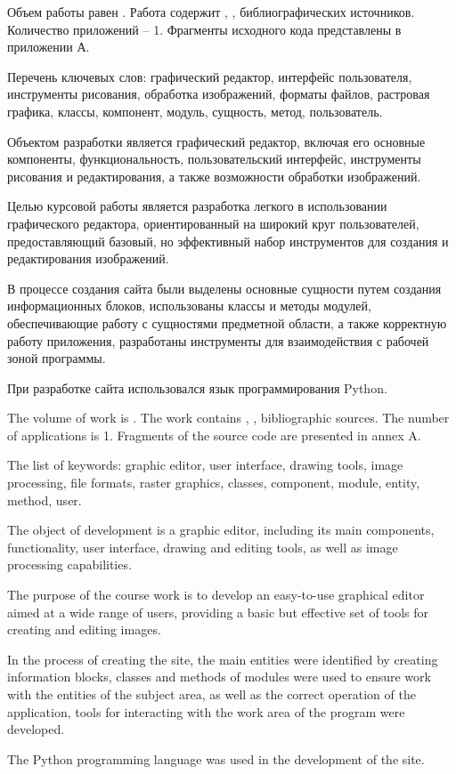 
Объем работы равен . Работа содержит , ,  библиографических источников. Количество приложений – 1. Фрагменты исходного кода представлены в приложении А.

Перечень ключевых слов: графический редактор, интерфейс пользователя, инструменты рисования, обработка изображений, форматы файлов, растровая графика, классы, компонент, модуль, сущность, метод, пользователь.

Объектом разработки является графический редактор, включая его основные компоненты, функциональность, пользовательский интерфейс, инструменты рисования и редактирования, а также возможности обработки изображений.

Целью курсовой работы является разработка легкого в использовании графического редактора, ориентированный на широкий круг пользователей, предоставляющий базовый, но эффективный набор инструментов для создания и редактирования изображений.

В процессе создания сайта были выделены основные сущности путем создания информационных блоков, использованы классы и методы модулей, обеспечивающие работу с сущностями предметной области, а также корректную работу приложения, разработаны инструменты для взаимодействия с рабочей зоной программы.

При разработке сайта использовался язык программирования Python.

  
The volume of work is . The work contains , ,  bibliographic sources. The number of applications is 1. Fragments of the source code are presented in annex A.

The list of keywords: graphic editor, user interface, drawing tools, image processing, file formats, raster graphics, classes, component, module, entity, method, user.

The object of development is a graphic editor, including its main components, functionality, user interface, drawing and editing tools, as well as image processing capabilities.

The purpose of the course work is to develop an easy-to-use graphical editor aimed at a wide range of users, providing a basic but effective set of tools for creating and editing images.

In the process of creating the site, the main entities were identified by creating information blocks, classes and methods of modules were used to ensure work with the entities of the subject area, as well as the correct operation of the application, tools for interacting with the work area of the program were developed.

The Python programming language was used in the development of the site.
